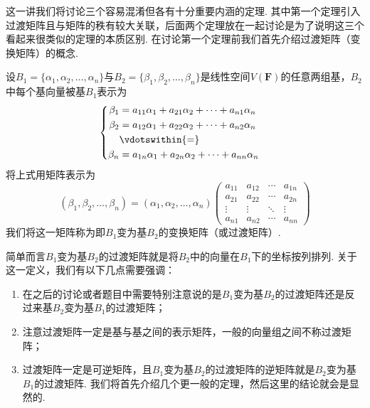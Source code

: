 这一讲我们将讨论三个容易混淆但各有十分重要内涵的定理. 其中第一个定理引入过渡矩阵且与矩阵的秩有较大关联，后面两个定理放在一起讨论是为了说明这三个看起来很类似的定理的本质区别. 在讨论第一个定理前我们首先介绍过渡矩阵（变换矩阵）的概念.
\begin{definition}
    设$B_1=\{\alpha_1,\alpha_2,\ldots,\alpha_n\}$与$B_2=\{\beta_1,\beta_2,\ldots,\beta_n\}$是线性空间$V(\mathbf{F})$的任意两组基，$B_2$中每个基向量被基$B_1$表示为
    \[ \begin{cases} \begin{aligned}
                \beta_1 & = a_{11}\alpha_1+a_{21}\alpha_2+\cdots+a_{n1}\alpha_n \\
                \beta_2 & = a_{12}\alpha_1+a_{22}\alpha_2+\cdots+a_{n2}\alpha_n \\
                        & \vdotswithin{=}                                       \\
                \beta_n & = a_{1n}\alpha_1+a_{2n}\alpha_2+\cdots+a_{nn}\alpha_n
            \end{aligned} \end{cases} \]
    将上式用矩阵表示为
    \[(\beta_1,\beta_2,\ldots,\beta_n)=(\alpha_1,\alpha_2,\ldots,\alpha_n)\begin{pmatrix}
            a_{11} & a_{12} & \cdots & a_{1n} \\
            a_{21} & a_{22} & \cdots & a_{2n} \\
            \vdots & \vdots & \ddots & \vdots \\
            a_{n1} & a_{n2} & \cdots & a_{nn}
        \end{pmatrix}\]
    我们将这一矩阵称为即$B_1$变为基$B_2$的变换矩阵（或过渡矩阵）.
\end{definition}
简单而言$B_1$变为基$B_2$的过渡矩阵就是将$B_2$中的向量在$B_1$下的坐标按列排列. 关于这一定义，我们有以下几点需要强调：
\begin{enumerate}
    \item 在之后的讨论或者题目中需要特别注意说的是$B_1$变为基$B_2$的过渡矩阵还是反过来基$B_2$变为基$B_1$的过渡矩阵；

    \item 注意过渡矩阵一定是基与基之间的表示矩阵，一般的向量组之间不称过渡矩阵；

    \item 过渡矩阵一定是可逆矩阵，且$B_1$变为基$B_2$的过渡矩阵的逆矩阵就是$B_2$变为基$B_1$的过渡矩阵. 我们将首先介绍几个更一般的定理，然后这里的结论就会是显然的.
\end{enumerate}

